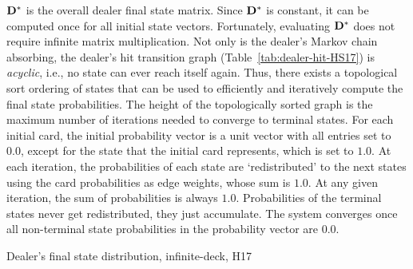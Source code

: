 $\mathbf{D^*}$ is the overall dealer final state matrix.  
Since $\mathbf{D^*}$ is constant, it can be computed once
for all initial state vectors.
Fortunately, evaluating $\mathbf{D^*}$ does not require infinite 
matrix multiplication.
Not only is the dealer's Markov chain absorbing, 
the dealer's hit transition graph
(Table~\ref{tab:dealer-hit-HS17})
is \emph{acyclic}, i.e., no state can ever reach itself again.  
Thus, there exists a topological sort
ordering of states that can be used to efficiently and iteratively 
compute the final state probabilities.
The height of the topologically sorted graph is the maximum 
number of iterations needed to converge to terminal states.
For each initial card, the initial probability vector
is a unit vector with all entries set to $0.0$, except for the state
that the initial card represents, which is set to $1.0$.
At each iteration, the probabilities of each state are 
`redistributed' to the next states using the 
card probabilities as edge weights, whose sum is $1.0$.  
At any given iteration, the sum of probabilities is always $1.0$.
Probabilities of the terminal states never get redistributed, 
they just accumulate.  
The system converges once all non-terminal state probabilities 
in the probability vector are 0.0.


\begin{comment}
\begin{table}[ht!]
\caption{Dealer's final state distribution, H17, pre-peek}
\begin{center}

\end{center}
\label{tab:dealer-final-H17-pre-peek}
\end{table}

\begin{table}[ht!]
\caption{Dealer's final state distribution, H17, post-peek}
\begin{center}

\end{center}
\label{tab:dealer-final-H17-post-peek}
\end{table}
\end{comment}

\begin{table}[ht!]
\caption{Dealer's final state distribution, infinite-deck, H17}
\begin{center}

\end{center}
\label{tab:dealer-final-H17}
\end{table}

